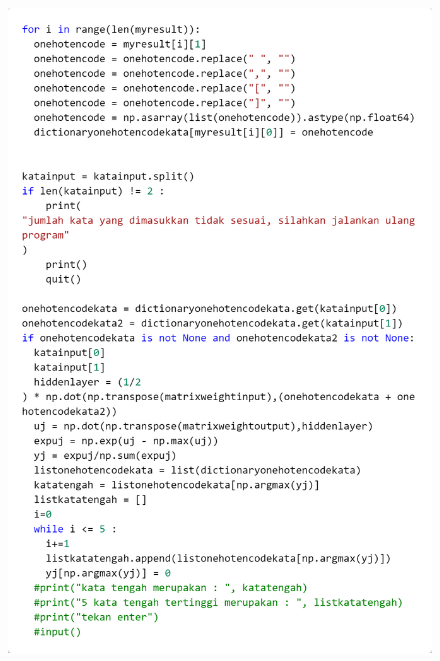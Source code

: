 \documentclass[12pt]{report}
\begin{document}
\begin{figure}[H]
\centering
\includegraphics[scale=0.3]{search2cbow2}
\end{figure}
\end{document}
